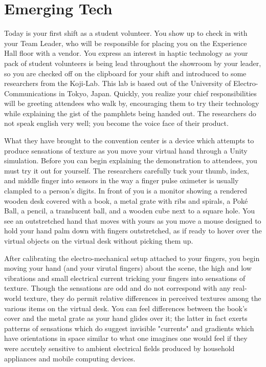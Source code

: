 \documentclass[../main.tex]{subfiles}
\begin{document}
\section{Emerging Tech}

Today is your first shift as a student volunteer. You show up to check in with your Team Leader, who will be responsible for placing you on the Experience Hall floor with a vendor. You express an interest in haptic technology as your pack of student volunteers is being lead throughout the showroom by your leader, so you are checked off on the clipboard for your shift and introduced to some researchers from the Koji-Lab. This lab is based out of the University of Electro-Communications in Tokyo, Japan. Quickly, you realize your chief responsibilities will be greeting attendees who walk by, encouraging them to try their technology while explaining the gist of the pamphlets being handed out. The researchers do not speak english very well; you become the voice face of their product.

What they have brought to the convention center is a device which attempts to produce sensations of texture as you move your virtual hand through a Unity simulation. Before you can begin explaining the demonstration to attendees, you must try it out for yourself. The researchers carefully tuck your thumb, index, and middle finger into sensors in the way a finger pulse oximeter is usually clampled to a person's digits. In front of you is a monitor showing a rendered wooden desk covered with a book, a metal grate with ribs and spirals, a Poké Ball, a pencil, a translucent ball, and a wooden cube next to a square hole. You see an outstretched hand that moves with yours as you move a mouse designed to hold your hand palm down with fingers outstretched, as if ready to hover over the virtual objects on the virtual desk without picking them up.

After calibrating the electro-mechanical setup attached to your fingers, you begin moving your hand (and your virutal fingers) about the scene, the high and low vibrations and small electrical current tricking your fingers into sensations of texture. Though the sensations are odd and do not correspond with any real-world texture, they do permit relative differences in perceived textures among the various items on the virtual desk. You can feel differences between the book's cover and the metal grate as your hand glides over it; the latter in fact exerts patterns of sensations which do suggest invisible "currents" and gradients which have orientations in space similar to what one imagines one would feel if they were accutely sensitive to ambient electrical fields produced by household appliances and mobile computing devices.
\end{document}
